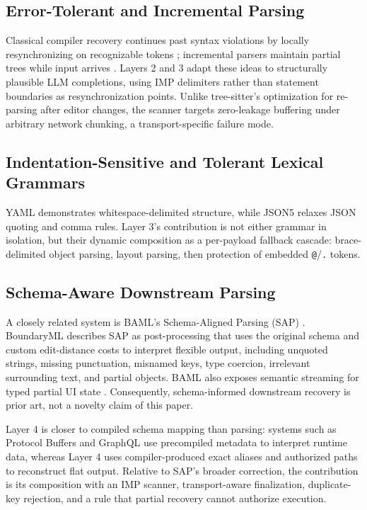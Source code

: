 \documentclass[conference]{IEEEtran}
\begin{document}
\subsection{Error-Tolerant and Incremental Parsing}

Classical compiler recovery continues past syntax violations by locally
resynchronizing on recognizable tokens \cite{burkefisher}; incremental parsers
maintain partial trees while input arrives \cite{wagnergraham,treesitter}.
Layers 2 and 3 adapt these ideas to structurally plausible LLM completions,
using IMP delimiters rather than statement boundaries as resynchronization
points. Unlike tree-sitter's optimization for re-parsing after editor changes,
the scanner targets zero-leakage buffering under arbitrary network chunking, a
transport-specific failure mode.

\subsection{Indentation-Sensitive and Tolerant Lexical Grammars}

YAML \cite{yamlspec} demonstrates whitespace-delimited structure, while JSON5
\cite{json5spec} relaxes JSON quoting and comma rules. Layer 3's contribution
is not either grammar in isolation, but their dynamic composition as a
per-payload fallback cascade: brace-delimited object parsing, layout parsing,
then protection of embedded \texttt{@}/\texttt{.} tokens.

\subsection{Schema-Aware Downstream Parsing}

A closely related system is BAML's Schema-Aligned Parsing (SAP)
\cite{baml-sap}. BoundaryML describes SAP as post-processing that uses the
original schema and custom edit-distance costs to interpret flexible output,
including unquoted strings, missing punctuation, misnamed keys, type coercion,
irrelevant surrounding text, and partial objects. BAML also exposes semantic
streaming for typed partial UI state \cite{baml-docs}. Consequently,
schema-informed downstream recovery is prior art, not a novelty claim of this
paper.

Layer 4 is closer to compiled schema mapping than parsing: systems such as
Protocol Buffers \cite{protobuf} and GraphQL \cite{graphqlspec} use precompiled
metadata to interpret runtime data, whereas Layer 4 uses compiler-produced
exact aliases and authorized paths to reconstruct flat output. Relative to
SAP's broader correction, the contribution is its composition with an IMP
scanner, transport-aware finalization, duplicate-key rejection, and a rule that
partial recovery cannot authorize execution.
\end{document}

